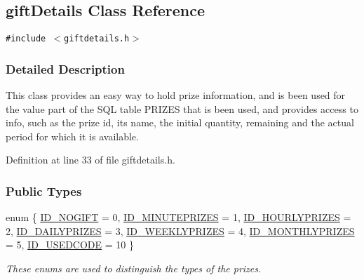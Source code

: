 \hypertarget{classgiftDetails}{
\subsection{gift\-Details Class Reference}
\label{classgiftDetails}
}
{\tt \#include $<$giftdetails.h$>$}



\subsubsection{Detailed Description}
This class provides an easy way to hold prize information, and is been used for the value part of the SQL table PRIZES that is been used, and provides access to info, such as the prize id, its name, the initial quantity, remaining and the actual period for which it is available. 



Definition at line 33 of file giftdetails.h.\subsubsection*{Public Types}
\begin{CompactItemize}
\item 
enum \{ \hyperlink{classgiftDetails_giftDetailss7giftDetailss0}{ID\_\-NOGIFT} =  0, 
\hyperlink{classgiftDetails_giftDetailss7giftDetailss1}{ID\_\-MINUTEPRIZES} =  1, 
\hyperlink{classgiftDetails_giftDetailss7giftDetailss2}{ID\_\-HOURLYPRIZES} =  2, 
\hyperlink{classgiftDetails_giftDetailss7giftDetailss3}{ID\_\-DAILYPRIZES} =  3, 
\hyperlink{classgiftDetails_giftDetailss7giftDetailss4}{ID\_\-WEEKLYPRIZES} =  4, 
\hyperlink{classgiftDetails_giftDetailss7giftDetailss5}{ID\_\-MONTHLYPRIZES} =  5, 
\hyperlink{classgiftDetails_giftDetailss7giftDetailss6}{ID\_\-USEDCODE} =  10
 \}
\begin{CompactList}\small\item\em These enums are used to distinguish the types of the prizes.\item\end{CompactList}\end{CompactItemize}

